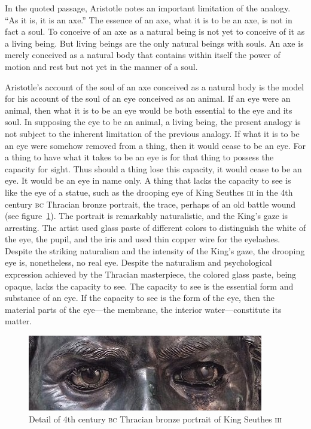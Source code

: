 In the quoted passage, Aristotle notes an important limitation of the analogy. ``As it is, it is an axe.'' The essence of an axe, what it is to be an axe, is not in fact a soul. To conceive of an axe as a natural being is not yet to conceive of it as a living being. But living beings are the only natural beings with souls. An axe is merely conceived as a natural body that contains within itself the power of motion and rest but not yet in the manner of a soul.

Aristotle's account of the soul of an axe conceived as a natural body is the model for his account of the soul of an eye conceived as an animal. If an eye were an animal, then what it is to be an eye would be both essential to the eye and its soul. In supposing the eye to be an animal, a living being, the present analogy is not subject to the inherent limitation of the previous analogy. If what it is to be an eye were somehow removed from a thing, then it would cease to be an eye. For a thing to have what it takes to be an eye is for that thing to possess the capacity for sight. Thus should a thing lose this capacity, it would cease to be an eye. It would be an eye in name only. A thing that lacks the capacity to see is like the eye of a statue, such as the drooping eye of King Seuthes \textsc{iii} in the 4th century \textsc{bc} Thracian bronze portrait, the trace, perhaps of an old battle wound (see figure~\ref{fig:seuthesiii}). The portrait is remarkably naturalistic, and the King's gaze is arresting. The artist used glass paste of different colors to distinguish the white of the eye, the pupil, and the iris and used thin copper wire for the eyelashes. Despite the striking naturalism and the intensity of the King's gaze, the drooping eye is, nonetheless, no real eye. Despite the naturalism and psychological expression achieved by the Thracian masterpiece, the colored glass paste, being opaque, lacks the capacity to see. The capacity to see is the essential form and substance of an eye. If the capacity to see is the form of the eye, then the material parts of the eye---the membrane, the interior water---constitute its matter.

\begin{figure}[htbp]
	\centering
		\includegraphics[scale=1]{graphics/seuthesiii.jpg}
	\caption{Detail of 4th century \textsc{bc} Thracian bronze portrait of King Seuthes \textsc{iii}}
	\label{fig:seuthesiii}
\end{figure}

